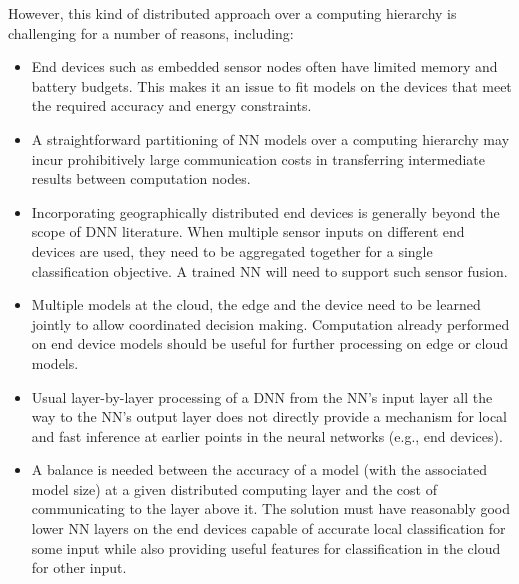 \documentclass[10pt, conference, compsocconf]{IEEEtran}
\begin{document}
However, this kind of distributed approach over a computing hierarchy is challenging for a number of reasons, including:


\begin{itemize}

    \item End devices such as embedded sensor nodes often have limited memory and battery budgets. This makes it an issue to fit models on the devices that meet the required accuracy and energy constraints.
    
    \item A straightforward partitioning of NN models over a computing hierarchy may incur prohibitively large communication costs in transferring intermediate results between computation nodes.
    
    \item Incorporating geographically distributed end devices is generally beyond the scope of DNN literature. When multiple sensor inputs on different end devices are used, they need to be aggregated together for a single classification objective. A trained NN will need to support such sensor fusion.
    
    \item Multiple models at the cloud, the edge and the device need to be learned jointly to allow coordinated decision making. Computation already performed on end device models should be useful for further processing on edge or cloud models.
        
    \item Usual layer-by-layer processing of a DNN from the NN's input layer all the way to the NN's output layer does not directly provide a mechanism for local and fast inference at earlier points in the neural networks (e.g., end devices).
        
    \item A balance is needed between the accuracy of a model (with the associated model size) at a given distributed computing layer and the cost of communicating to the layer above it. The solution must have reasonably good lower NN layers on the end devices capable of accurate local classification for some input while also providing useful features for classification in the cloud for other input. 
    

\end{itemize}
\end{document}
